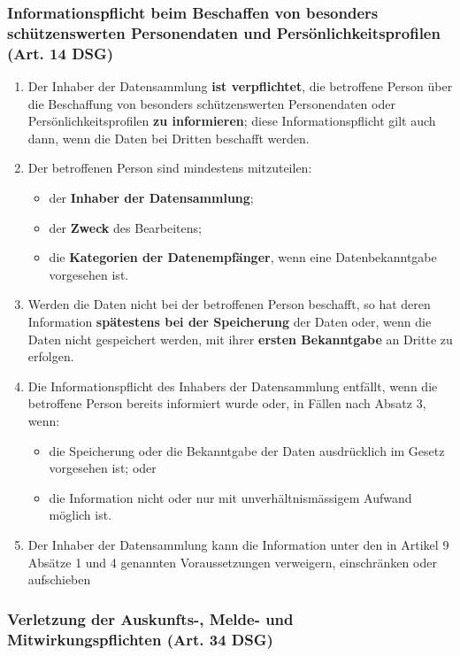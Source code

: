 \subsubsection{Informationspflicht beim Beschaffen von besonders
schützenswerten Personendaten und Persönlichkeitsprofilen (Art. 14 DSG)}
\label{sec:Datenschutz-Informationspflicht}

\begin{enumerate}
	\tightlist
	\item Der Inhaber der Datensammlung \textbf{ist verpflichtet}, die
	betroffene Person über die Beschaffung von besonders schützenswerten
	Personendaten oder Persönlichkeitsprofilen \textbf{zu informieren};
	diese Informationspflicht gilt auch dann, wenn die Daten bei Dritten
	beschafft werden.
	\item Der betroffenen Person sind mindestens mitzuteilen:
	\begin{itemize}
		\tightlist
		\item der \textbf{Inhaber der Datensammlung};
		\item der \textbf{Zweck} des Bearbeitens;
		\item die \textbf{Kategorien der Datenempfänger}, wenn eine
		Datenbekanntgabe vorgesehen ist.
	\end{itemize}
	\item Werden die Daten nicht bei der betroffenen Person beschafft, so hat
	deren Information \textbf{spätestens bei der Speicherung} der Daten
	oder, wenn die Daten nicht gespeichert werden, mit ihrer
	\textbf{ersten Bekanntgabe} an Dritte zu erfolgen.
	\item Die Informationspflicht des Inhabers der Datensammlung entfällt, wenn
	die betroffene Person bereits informiert wurde oder, in Fällen nach
	Absatz 3, wenn:
	\begin{itemize}
		\tightlist
		\item die Speicherung oder die Bekanntgabe der Daten ausdrücklich im
		Gesetz vorgesehen ist; oder
		\item die Information nicht oder nur mit unverhältnismässigem Aufwand
		möglich ist.
	\end{itemize}
	\item Der Inhaber der Datensammlung kann die Information unter den in
	Artikel 9 Absätze 1 und 4 genannten Voraussetzungen verweigern,	einschränken
	oder aufschieben
\end{enumerate}


\subsubsection{Verletzung der Auskunfts-, Melde- und Mitwirkungspflichten
(Art. 34 DSG)}
\label{sec:Datenschutz-Strafe}

